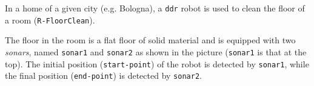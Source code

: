 \documentclass{../llncs}
\newcommand{\code}[1]{{\color{blue}\small{\texttt{#1}}}}
\begin{document}

In a home of a given city (e.g. Bologna), a \texttt{ddr} robot is used to clean the floor of a room (\code{R-FloorClean}).

The floor in the room is a flat floor of solid material and is equipped with two \emph{sonars}, named \code{sonar1} and \code{sonar2} as shown in the picture (\code{sonar1} is that at the top). The initial position (\code{start-point}) of the robot is detected by \code{sonar1}, while the final position (\code{end-point}) is detected by \code{sonar2}.\\
\end{document}
